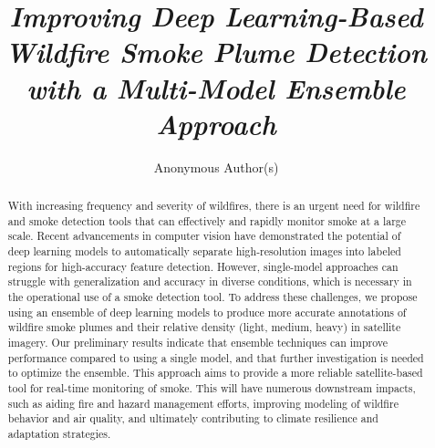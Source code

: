 \documentclass{article}
\title{\textit{Improving Deep Learning-Based Wildfire Smoke Plume Detection with a Multi-Model Ensemble Approach}}
\author{%
Anonymous Author(s)
}
\begin{document}
\maketitle

\begin{abstract}
With increasing frequency and severity of wildfires, there is an urgent need for wildfire and smoke detection tools that can effectively and rapidly monitor smoke at a large scale. Recent advancements in computer vision have demonstrated the potential of deep learning models to automatically separate high-resolution images into labeled regions for high-accuracy feature detection. However, single-model approaches can struggle with generalization and accuracy in diverse conditions, which is necessary in the operational use of a smoke detection tool. To address these challenges, we propose using an ensemble of deep learning models to produce more accurate annotations of wildfire smoke plumes and their relative density (light, medium, heavy) in satellite imagery. Our preliminary results indicate that ensemble techniques can improve performance compared to using a single model, and that further investigation is needed to optimize the ensemble. This approach aims to provide a more reliable satellite-based tool for real-time monitoring of smoke. This will have numerous downstream impacts, such as aiding fire and hazard management efforts, improving modeling of wildfire behavior and air quality, and ultimately contributing to climate resilience and adaptation strategies.
\end{abstract}
\end{document}
